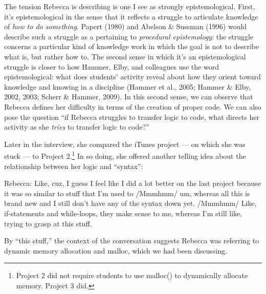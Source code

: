 The tension Rebecca is describing is one I see as strongly
epistemological. First, it's epistemological in the sense that it
reflects a struggle to articulate knowledge of \emph{how to do
something}. Papert (1980) and Abelson \& Sussman (1996) would describe
such a struggle as a pertaining to \emph{procedural epistemology}: the
struggle concerns a particular kind of knowledge work in which the goal
is not to describe what is, but rather how to. The second sense in which
it's an epistemological struggle is closer to how Hammer, Elby, and
colleagues use the word epistemological: what does students' activity
reveal about how they orient toward knowledge and knowing in a
discipline (Hammer et al., 2005; Hammer \& Elby, 2002, 2003; Scherr \&
Hammer, 2009). In this second sense, we can observe that Rebecca defines
her difficulty in terms of the creation of proper code. We can also pose
the question ``if Rebecca struggles to transfer logic to code, what
directs her activity as she \emph{tries} to transfer logic to code?''

Later in the interview, she compared the iTunes project --- on which she
was stuck --- to Project 2.\footnote{Project 2 did not require students
  to use malloc() to dynamically allocate memory. Project 3 did.} In so
doing, she offered another telling idea about the relationship between
her logic and ``syntax'':

Rebecca: Like, cuz, I guess I feel like I did a lot better on the last
project because it was so similar to stuff that I'm used to /Mmmhmm/ um,
whereas all this is brand new and I still don't have any of the syntax
down yet. /Mmmhmm/ Like, if-statements and while-loops, they make sense
to me, whereas I'm still like, trying to grasp at this stuff.

By ``this stuff,'' the context of the conversation suggests Rebecca was
referring to dynamic memory allocation and malloc, which we had been
discussing.

